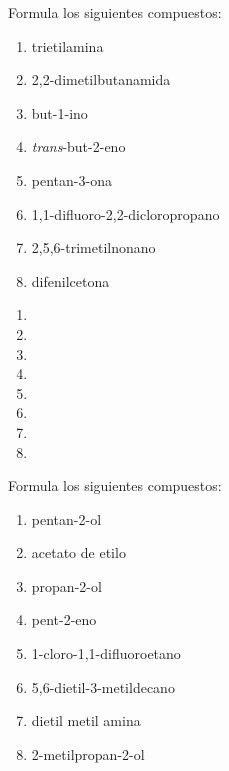 \begin{exercise}[
    tags    = {orgánica,nomenclatura,múltiple,2B},
    topics  = {química orgánica,formulación,nomenclatura},
    source  = {Química 2B SAN 2016, p392, e20},
  ]
  Formula los siguientes compuestos:

  \begin{enumerate}
    \item trietilamina
    \item 2,2-dimetilbutanamida
    \item but-1-ino
    \item \textit{trans}-but-2-eno
    \item pentan-3-ona
    \item 1,1-difluoro-2,2-dicloropropano
    \item 2,5,6-trimetilnonano
    \item difenilcetona
  \end{enumerate}
\end{exercise}

\begin{solution}
  \begin{enumerate}
    \item {}
    \item {}
    \item {}
    \item {}
    \item {}
    \item {}
    \item {}
    \item {}
  \end{enumerate}
\end{solution}



\begin{exercise}[
    tags    = {orgánica,nomenclatura,múltiple,2B},
    topics  = {química orgánica,formulación,nomenclatura},
    source  = {Química 2B SAN 2016, p392, e21},
  ]
  Formula los siguientes compuestos:

  \begin{enumerate}
    \item pentan-2-ol
    \item acetato de etilo
    \item propan-2-ol
    \item pent-2-eno
    \item 1-cloro-1,1-difluoroetano
    \item 5,6-dietil-3-metildecano
    \item dietil metil amina
    \item 2-metilpropan-2-ol
  \end{enumerate}
\end{exercise}

